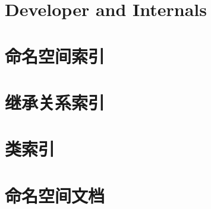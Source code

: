 \documentclass[twoside]{book}
\newcommand{\+}{\discretionary{\mbox{\scriptsize$\hookleftarrow$}}{}{}}
\begin{document}
\begin{CJK}{UTF8}{gbsn}
\chapter{Developer and Internals}
\label{dev-welcome}

\chapter{命名空间索引}

\chapter{继承关系索引}

\chapter{类索引}

\chapter{命名空间文档}






\end{CJK}
\end{document}
